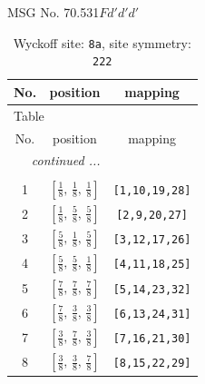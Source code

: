 \documentclass[fleqn,8pt]{jsarticle}
\begin{document}
\setcounter{MaxMatrixCols}{32}

\renewcommand{\tablename}{Table~}
\renewcommand{\figurename}{Figure~}
\begin{center}
\LARGE
MSG No. 70.531\quad$Fd'd'd'$
\end{center}
\renewcommand{\arraystretch}{1.2}
\begin{longtable}{ccc}
\caption{Wyckoff site: {\tt 8a}, site symmetry: {\tt 222}}
 \\
 \hline \hline
No. & position & mapping \\ \hline \endfirsthead

\multicolumn{2}{l}{\tablename\ \thetable{}} \\
 \hline \hline
No. & position & mapping \\ \hline \endhead

 \hline \hline
\multicolumn{2}{r}{\footnotesize\it continued ...} \\ \endfoot

 \hline \hline
\multicolumn{2}{r}{} \\ \endlastfoot

1 & $\left[ \frac{1}{8},\, \frac{1}{8},\, \frac{1}{8} \right]$ & {\tt [1,10,19,28]} \\ \hline
2 & $\left[ \frac{1}{8},\, \frac{5}{8},\, \frac{5}{8} \right]$ & {\tt [2,9,20,27]} \\ \hline
3 & $\left[ \frac{5}{8},\, \frac{1}{8},\, \frac{5}{8} \right]$ & {\tt [3,12,17,26]} \\ \hline
4 & $\left[ \frac{5}{8},\, \frac{5}{8},\, \frac{1}{8} \right]$ & {\tt [4,11,18,25]} \\ \hline
5 & $\left[ \frac{7}{8},\, \frac{7}{8},\, \frac{7}{8} \right]$ & {\tt [5,14,23,32]} \\ \hline
6 & $\left[ \frac{7}{8},\, \frac{3}{8},\, \frac{3}{8} \right]$ & {\tt [6,13,24,31]} \\ \hline
7 & $\left[ \frac{3}{8},\, \frac{7}{8},\, \frac{3}{8} \right]$ & {\tt [7,16,21,30]} \\ \hline
8 & $\left[ \frac{3}{8},\, \frac{3}{8},\, \frac{7}{8} \right]$ & {\tt [8,15,22,29]} \\
\end{longtable}
\renewcommand{\arraystretch}{1.2}
\end{document}
